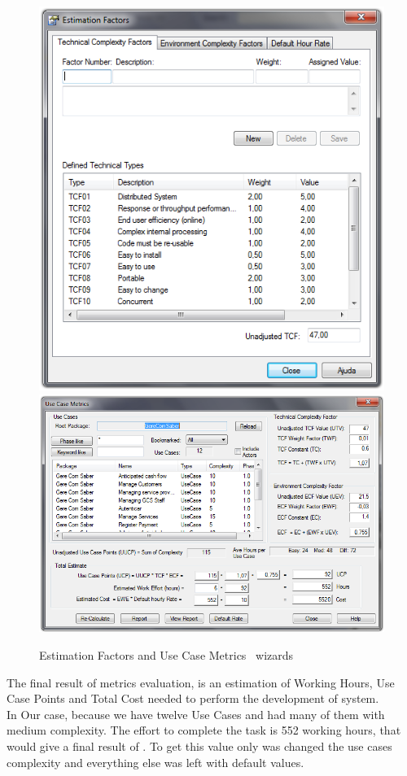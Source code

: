 \begin{figure}[!htbp]
\includegraphics[scale=0.257]{images/sparxestim.png}
\hspace{0.1cm}
\includegraphics[scale=0.29]{images/sparx.png}
\caption{Estimation Factors and Use Case Metrics \entArch~wizards}\label{img:sparxRes}
\end{figure}

The final result of metrics evaluation, is an estimation of Working Hours, Use Case Points\cite{Ribu01estimatingobject-oriented} and Total Cost needed to perform
the development of system.\\

In Our case, because we have twelve Use Cases and had many of them with medium complexity. The effort to complete the task is 552 working hours, that would give a final result of . 
To get this value only was changed the use cases complexity and everything else was left with default values.

